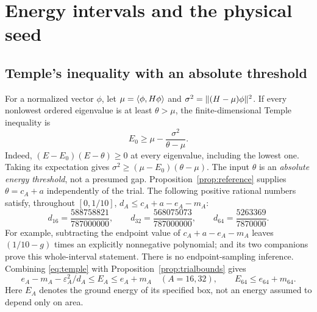 \section{Energy intervals and the physical seed}\label{sec:seed}
\subsection{Temple's inequality with an absolute threshold}
For a normalized vector $\phi$, let $\mu=\langle \phi,H\phi\rangle$ and
$\sigma^2=\lVert (H-\mu)\phi\rVert^2$. If every nonlowest ordered eigenvalue is at
least $\theta>\mu$, the finite-dimensional Temple inequality is
\begin{equation}\label{eq:temple}
 E_0\ge\mu-\frac{\sigma^2}{\theta-\mu}.
\end{equation}
Indeed, $(E-E_0)(E-\theta)\ge0$ at every eigenvalue, including the lowest one.
Taking its expectation gives
$\sigma^2\ge(\mu-E_0)(\theta-\mu)$.
The input $\theta$ is an \emph{absolute energy threshold}, not a presumed gap.
Proposition~\ref{prop:reference} supplies $\theta=c_A+a$ independently of the
trial. The following positive rational numbers satisfy, throughout $[0,1/10]$,
$d_A\le c_A+a-e_A-m_A$:
\begin{equation}\label{eq:denominators}
 d_{16}=\frac{588758821}{787000000},\qquad
 d_{32}=\frac{568075073}{787000000},\qquad
 d_{64}=\frac{5263369}{7870000}.
\end{equation}
For example, subtracting the endpoint value of
$c_A+a-e_A-m_A$ leaves $(1/10-g)$ times an explicitly nonnegative polynomial;
 and its two companions prove this
whole-interval statement. There is no endpoint-sampling inference.
Combining \eqref{eq:temple} with Proposition~\ref{prop:trialbounds} gives
\begin{equation}\label{eq:energyinterval}
 e_A-m_A-\varepsilon_A^2/d_A\le E_A\le e_A+m_A
 \quad(A=16,32),\qquad E_{64}\le e_{64}+m_{64}.
\end{equation}
Here $E_A$ denotes the ground energy of its specified box, not an energy
assumed to depend only on area.

